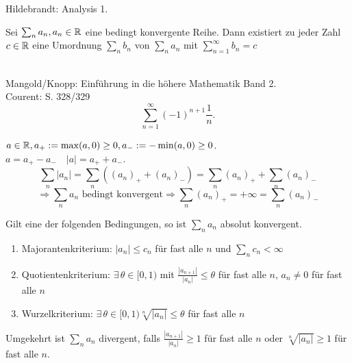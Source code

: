 \documentclass[../ana1.tex]{subfiles}
\begin{document}
\begin{bew}
    Hildebrandt: Analysis 1.
\end{bew}
\begin{satz*}[Riemann]
    Sei \( \sum_n a_n, a_n \in\mathbb{R} \) eine bedingt konvergente Reihe. Dann existiert zu jeder Zahl \( c\in\mathbb{R} \) eine Umordnung \( \sum_n b_n \) von \( \sum_n a_n \) mit \( \sum_{n=1}^\infty b_n = c \)
\end{satz*}
\begin{bspe}\leavevmode \\
    Mangold/Knopp: Einführung in die höhere Mathematik Band 2.\\
    Courent:  S. 328/329
    \[ \sum_{n=1}^\infty {(-1)}^{n+1} \frac{1}{n}. \]
\end{bspe}
\begin{bem}
    \( a\in\mathbb{R}, a_+ := \max(a,0) \geq 0, a_- := -\min(a,0)\geq 0 \).\\
    \( a = a_+ - a_- \quad |a| = a_+ + a_- \).
    \[ \sum_n |a_n| = \sum_n \left( {(a_n)}_+ + {(a_n)}_- \right) = \sum_n {(a_n)}_+ + \sum_n {(a_n)}_- \]
    \[ \Rightarrow \sum_n a_n \text{ bedingt konvergent} \Rightarrow \sum_n {(a_n)}_+ = +\infty = \sum_n {(a_n)}_- \]
\end{bem}
\begin{satz}
    Gilt eine der folgenden Bedingungen, so ist \( \sum_n a_n \) absolut konvergent.
    \begin{enumerate}
        \item Majorantenkriterium: \( |a_n| \leq c_n \) für fast alle \(n\) und \( \sum_n c_n < \infty \)
        \item Quotientenkriterium: \( \exists\, \theta \in [0,1) \) mit \( \frac{|a_{n+1}|}{|a_n|} \leq \theta \) für fast alle \(n\), \(a_n \neq 0\) für fast alle \(n\)
        \item Wurzelkriterium: \( \exists \, \theta \in [0,1) \sqrt[n]{|a_n|} \leq \theta \) für fast alle \(n\)
    \end{enumerate}
    Umgekehrt ist \( \sum_n a_n \) divergent, falls \( \frac{|a_{n+1}|}{|a_n|} \geq 1 \) für fast alle \(n\) oder \( \sqrt[n]{|a_n|} \geq 1 \) für fast alle \(n\).
\end{satz}
\end{document}
